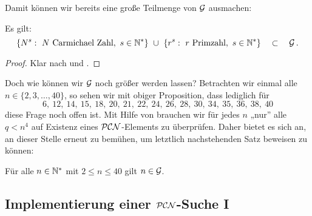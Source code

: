 Damit können wir bereits eine große Teilmenge von $\mathcal{G}$ ausmachen:

\begin{proposition}
  \label{prop:G}
  Es gilt:
  \[ \{ N^s:\ N\text{ Carmichael Zahl},\ s\in \N^\ast\} \ \cup\ 
    \{ r^s:\ r \text{ Primzahl},\ s\in \N^\ast\} \quad\subset\quad \G\,. \]
\end{proposition}
\begin{proof}
  Klar nach  und 
  .
\end{proof}

Doch wie können wir $\mathcal{G}$ noch größer werden lassen? 
Betrachten wir einmal alle $n\in \{ 2,3,\ldots,40\}$, so sehen wir mit
obiger Proposition, dass lediglich für 
\[ 6,\ 12,\ 14,\ 15,\ 18,\ 20,\ 21,\ 22,\ 24,\ 26,\ 28,\ 30,\ 
  34,\ 35,\ 36,\ 38,\ 40\]
diese Frage noch offen ist.
Mit Hilfe von  brauchen wir für jedes $n$ 
„nur” alle $q < n^4$ auf Existenz eines $\mathcal{PCN}$-Elements zu überprüfen. Daher
bietet es sich an, an dieser Stelle erneut \sage zu bemühen, um letztlich
nachstehenden Satz beweisen zu können:

\begin{satz}
  \label{satz:hauptsatz_g}
  Für alle $n\in \mathbb{N}^\ast$ mit $2 \leq n \leq 40$ gilt
  $n \in \mathcal{G}$.
\end{satz}


\subsection{Implementierung einer $\mathcal{PCN}$-Suche I}

